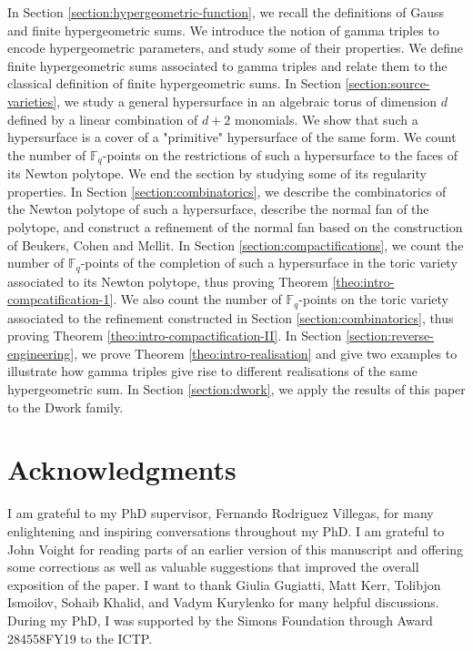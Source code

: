 \documentclass[11pt, reqno]{amsart}
\theoremstyle{plain}
\theoremstyle{definition}
\newcommand{\F}{\mathbb{F}}
\begin{document}
In Section \ref{section:hypergeometric-function}, we recall the definitions of Gauss and finite hypergeometric sums.  
We introduce the notion of gamma triples to encode hypergeometric parameters, and study some of their properties. 
We define finite hypergeometric sums associated to gamma triples and relate them to the classical definition of finite hypergeometric sums.
In Section \ref{section:source-varieties}, we study a general hypersurface in an algebraic torus of dimension $d$ defined by a linear combination of $d+2$ monomials. We show that such a hypersurface is a cover of a "primitive" hypersurface of the same form.  We count the number of $\F_q$-points on the restrictions of such a hypersurface to the faces of its Newton polytope. We end the section by studying some of its regularity properties.
In Section \ref{section:combinatorics}, we describe the combinatorics of the Newton polytope of such a hypersurface, describe the normal fan of the polytope, and construct a refinement of the normal fan based on the construction of Beukers, Cohen and Mellit.
In Section \ref{section:compactifications}, we count the number of $\F_q$-points of the completion of such a hypersurface in the toric variety associated to its Newton polytope, thus proving Theorem \ref{theo:intro-compcatification-1}. We also count the number of $\F_q$-points on the toric variety associated to the refinement constructed in Section \ref{section:combinatorics}, thus proving Theorem \ref{theo:intro-compactification-II}.
In Section \ref{section:reverse-engineering}, we prove Theorem \ref{theo:intro-realisation} and give two examples to illustrate how gamma triples give rise to different realisations of the same hypergeometric sum.
In Section \ref{section:dwork}, we apply the results of this paper to the Dwork family. 
\section*{Acknowledgments} 
I am grateful to my PhD supervisor, Fernando Rodriguez Villegas, for many enlightening and inspiring conversations throughout my PhD. 
I am grateful to John Voight for reading parts of an earlier version of this manuscript and offering some corrections as well as valuable suggestions that improved the overall exposition of the paper. 
I want to thank Giulia Gugiatti, Matt Kerr, Tolibjon Ismoilov, Sohaib Khalid, and Vadym Kurylenko for many helpful discussions.  During my PhD, I was supported by the Simons Foundation through Award 284558FY19 to the ICTP.
\end{document}
